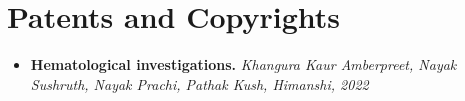 \documentclass[11pt,a4paper,sans]{moderncv}        %
\begin{document}
\section{Patents and Copyrights}
\vspace{5pt}
\begin{itemize}
\item{\textbf{Hematological investigations.}} \textit{Khangura Kaur Amberpreet, Nayak Sushruth, Nayak Prachi, Pathak Kush, Himanshi, 2022}
\end{itemize}

\nocite{*}



\end{document}

